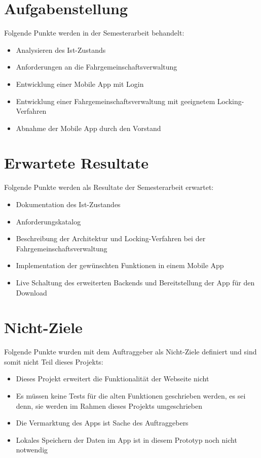 \section{Aufgabenstellung}\label{aufgabenstellung}
Folgende Punkte werden in der Semesterarbeit behandelt:
\begin{itemize}
\item Analysieren des Ist-Zustands
\item Anforderungen an die Fahrgemeinschaftsverwaltung
\item Entwicklung einer Mobile App mit Login
\item Entwicklung einer Fahrgemeinschaftsverwaltung mit geeignetem Locking-Verfahren
\item Abnahme der Mobile App durch den Vorstand
\end{itemize}

\section{Erwartete Resultate}\label{erwartete_resultate}
Folgende Punkte werden als Resultate der Semesterarbeit erwartet:
\begin{itemize}
\item Dokumentation des Ist-Zustandes
\item Anforderungskatalog
\item Beschreibung der Architektur und Locking-Verfahren bei der Fahrgemeinschaftsverwaltung
\item Implementation der gewünschten Funktionen in einem Mobile App
\item Live Schaltung des erweiterten Backends und Bereitstellung der App für den Download
\end{itemize}

\section{Nicht-Ziele}\label{nicht_ziele}
Folgende Punkte wurden mit dem Auftraggeber als Nicht-Ziele definiert und sind somit nicht Teil dieses Projekts:
\begin{itemize}
\item Dieses Projekt erweitert die Funktionalität der Webseite nicht
\item Es müssen keine Tests für die alten Funktionen geschrieben werden, es sei denn, sie werden im Rahmen dieses Projekts umgeschrieben
\item Die Vermarktung des Apps ist Sache des Auftraggebers
\item Lokales Speichern der Daten im App ist in diesem Prototyp noch nicht notwendig
\end{itemize}


